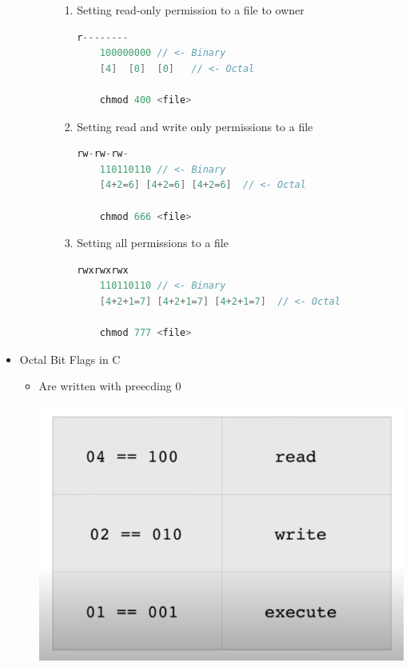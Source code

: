 \documentclass[12pt]{article}
\begin{document}
\begin{itemize}
\begin{itemize}
\begin{enumerate}[1.]
            \bigskip

            \begin{enumerate}[1.]
                \item Setting read-only permission to a file to owner
    \begin{lstlisting}[language=c]
    r--------
    100000000 // <- Binary
    [4]  [0]  [0]   // <- Octal

    chmod 400 <file>
    \end{lstlisting}
            \item Setting read and write only permissions to a file
    \begin{lstlisting}[language=c]
    rw-rw-rw-
    110110110 // <- Binary
    [4+2=6] [4+2=6] [4+2=6]  // <- Octal

    chmod 666 <file>
    \end{lstlisting}

            \item Setting all permissions to a file
    \begin{lstlisting}[language=c]
    rwxrwxrwx
    110110110 // <- Binary
    [4+2+1=7] [4+2+1=7] [4+2+1=7]  // <- Octal

    chmod 777 <file>
    \end{lstlisting}
            \end{enumerate}
        \end{enumerate}

    \end{itemize}

    \item Octal Bit Flags in C
    \begin{itemize}
        \item Are written with preecding 0

        \begin{center}
        \includegraphics[width=0.6\linewidth]{images/week_9_notes_3_3.png}
        \end{center}


\end{itemize}
\end{itemize}
\end{document}
